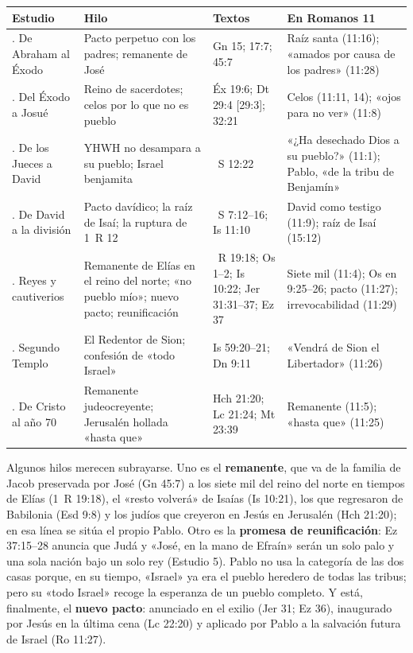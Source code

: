 \begin{center}\footnotesize
\renewcommand{\arraystretch}{1.3}
\begin{tabular}{>{\RaggedRight\arraybackslash}p{2.9cm}>{\RaggedRight\arraybackslash}p{4.4cm}>{\RaggedRight\arraybackslash}p{2.5cm}>{\RaggedRight\arraybackslash}p{4.2cm}}
\toprule
\textbf{Estudio} & \textbf{Hilo} & \textbf{Textos} & \textbf{En Romanos 11}\\
\midrule
1. De Abraham al Éxodo & Pacto perpetuo con los padres; remanente de José & Gn 15; 17:7; 45:7 & Raíz santa (11:16); «amados por causa de los padres» (11:28)\\
2. Del Éxodo a Josué & Reino de sacerdotes; celos por lo que no es pueblo & Éx 19:6; Dt 29:4 [29:3]; 32:21 & Celos (11:11, 14); «ojos para no ver» (11:8)\\
3. De los Jueces a David & YHWH no desampara a su pueblo; Israel benjamita & 1~S 12:22 & «¿Ha desechado Dios a su pueblo?» (11:1); Pablo, «de la tribu de Benjamín»\\
4. De David a la división & Pacto davídico; la raíz de Isaí; la ruptura de 1~R 12 & 2~S 7:12--16; Is 11:10 & David como testigo (11:9); raíz de Isaí (15:12)\\
5. Reyes y cautiverios & Remanente de Elías en el reino del norte; «no pueblo mío»; nuevo pacto; reunificación & 1~R 19:18; Os 1--2; Is 10:22; Jer 31:31--37; Ez 37 & Siete mil (11:4); Os en 9:25--26; pacto (11:27); irrevocabilidad (11:29)\\
6. Segundo Templo & El Redentor de Sion; confesión de «todo Israel» & Is 59:20--21; Dn 9:11 & «Vendrá de Sion el Libertador» (11:26)\\
7. De Cristo al año 70 & Remanente judeocreyente; Jerusalén hollada «hasta que» & Hch 21:20; Lc 21:24; Mt 23:39 & Remanente (11:5); «hasta que» (11:25)\\
\bottomrule
\end{tabular}\end{center}

Algunos hilos merecen subrayarse. Uno es el \textbf{remanente}, que va de la familia de Jacob preservada por José (Gn 45:7) a los siete mil del reino del norte en tiempos de Elías (1~R 19:18), el «resto volverá» de Isaías (Is 10:21), los que regresaron de Babilonia (Esd 9:8) y los judíos que creyeron en Jesús en Jerusalén (Hch 21:20); en esa línea se sitúa el propio Pablo. Otro es la \textbf{promesa de reunificación}: Ez 37:15--28 anuncia que Judá y «José, en la mano de Efraín» serán un solo palo y una sola nación bajo un solo rey (Estudio 5). Pablo no usa la categoría de las dos casas porque, en su tiempo, «Israel» ya era el pueblo heredero de todas las tribus; pero su «todo Israel» recoge la esperanza de un pueblo completo. Y está, finalmente, el \textbf{nuevo pacto}: anunciado en el exilio (Jer 31; Ez 36), inaugurado por Jesús en la última cena (Lc 22:20) y aplicado por Pablo a la salvación futura de Israel (Ro 11:27).


